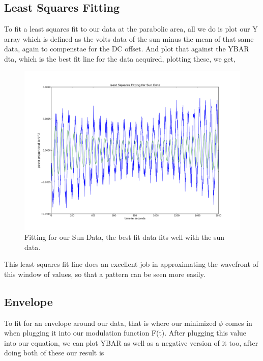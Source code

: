 \documentclass[12 pt]{article}
\begin{document}
\subsection*{Least Squares Fitting}
To fit a least squares fit to our data at the parabolic area, all we do
is plot our Y array which is defined as the volts data of the sun minus
the mean of that same data, again to compenstae for the DC offset. And
plot that against the YBAR dta, which is the best fit line for the data acquired,
plotting these, we get,   
\begin{figure}[H]
\centering
\includegraphics[scale=0.45]{sunlsqfit.png}
\caption{Fitting for our Sun Data, the best fit data fits well with the
  sun data.}
\label{sunlsqfit}
\end{figure}
This least squares fit line does an excellent job in approximating the
wavefront of this window of values,  so that a pattern can be seen more easily.
\subsection*{Envelope}
To fit for an envelope around our data, that is where our minimized
$\phi$ comes in when plugging it into our modulation function
F(t). After plugging this value into our equation, we can plot YBAR as
well as a negative version of it too, after doing both of these our
result is
 
\end{document}
